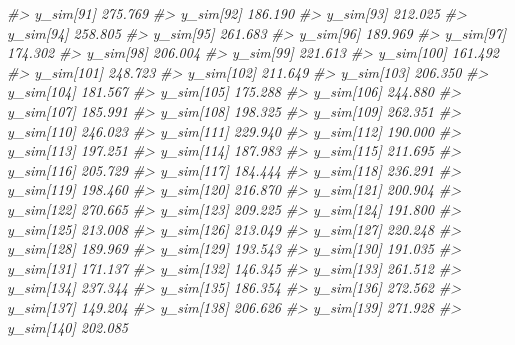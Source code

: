 \documentclass[
  10pt,
  italian,
  a4paper,
  extrafontsizes,onecolumn,openright
  ]{memoir}
\newenvironment{Shaded}{\begin{snugshade}}{\end{snugshade}}
\newcommand{\CommentTok}[1]{\textcolor[rgb]{0.56,0.35,0.01}{\textit{#1}}}
\begin{document}
\begin{Shaded}
\begin{Highlighting}[]
\CommentTok{\#\textgreater{}   y\_sim[91]  275.769}
\CommentTok{\#\textgreater{}   y\_sim[92]  186.190}
\CommentTok{\#\textgreater{}   y\_sim[93]  212.025}
\CommentTok{\#\textgreater{}   y\_sim[94]  258.805}
\CommentTok{\#\textgreater{}   y\_sim[95]  261.683}
\CommentTok{\#\textgreater{}   y\_sim[96]  189.969}
\CommentTok{\#\textgreater{}   y\_sim[97]  174.302}
\CommentTok{\#\textgreater{}   y\_sim[98]  206.004}
\CommentTok{\#\textgreater{}   y\_sim[99]  221.613}
\CommentTok{\#\textgreater{}   y\_sim[100] 161.492}
\CommentTok{\#\textgreater{}   y\_sim[101] 248.723}
\CommentTok{\#\textgreater{}   y\_sim[102] 211.649}
\CommentTok{\#\textgreater{}   y\_sim[103] 206.350}
\CommentTok{\#\textgreater{}   y\_sim[104] 181.567}
\CommentTok{\#\textgreater{}   y\_sim[105] 175.288}
\CommentTok{\#\textgreater{}   y\_sim[106] 244.880}
\CommentTok{\#\textgreater{}   y\_sim[107] 185.991}
\CommentTok{\#\textgreater{}   y\_sim[108] 198.325}
\CommentTok{\#\textgreater{}   y\_sim[109] 262.351}
\CommentTok{\#\textgreater{}   y\_sim[110] 246.023}
\CommentTok{\#\textgreater{}   y\_sim[111] 229.940}
\CommentTok{\#\textgreater{}   y\_sim[112] 190.000}
\CommentTok{\#\textgreater{}   y\_sim[113] 197.251}
\CommentTok{\#\textgreater{}   y\_sim[114] 187.983}
\CommentTok{\#\textgreater{}   y\_sim[115] 211.695}
\CommentTok{\#\textgreater{}   y\_sim[116] 205.729}
\CommentTok{\#\textgreater{}   y\_sim[117] 184.444}
\CommentTok{\#\textgreater{}   y\_sim[118] 236.291}
\CommentTok{\#\textgreater{}   y\_sim[119] 198.460}
\CommentTok{\#\textgreater{}   y\_sim[120] 216.870}
\CommentTok{\#\textgreater{}   y\_sim[121] 200.904}
\CommentTok{\#\textgreater{}   y\_sim[122] 270.665}
\CommentTok{\#\textgreater{}   y\_sim[123] 209.225}
\CommentTok{\#\textgreater{}   y\_sim[124] 191.800}
\CommentTok{\#\textgreater{}   y\_sim[125] 213.008}
\CommentTok{\#\textgreater{}   y\_sim[126] 213.049}
\CommentTok{\#\textgreater{}   y\_sim[127] 220.248}
\CommentTok{\#\textgreater{}   y\_sim[128] 189.969}
\CommentTok{\#\textgreater{}   y\_sim[129] 193.543}
\CommentTok{\#\textgreater{}   y\_sim[130] 191.035}
\CommentTok{\#\textgreater{}   y\_sim[131] 171.137}
\CommentTok{\#\textgreater{}   y\_sim[132] 146.345}
\CommentTok{\#\textgreater{}   y\_sim[133] 261.512}
\CommentTok{\#\textgreater{}   y\_sim[134] 237.344}
\CommentTok{\#\textgreater{}   y\_sim[135] 186.354}
\CommentTok{\#\textgreater{}   y\_sim[136] 272.562}
\CommentTok{\#\textgreater{}   y\_sim[137] 149.204}
\CommentTok{\#\textgreater{}   y\_sim[138] 206.626}
\CommentTok{\#\textgreater{}   y\_sim[139] 271.928}
\CommentTok{\#\textgreater{}   y\_sim[140] 202.085}

\end{Highlighting}
\end{Shaded}
\end{document}
